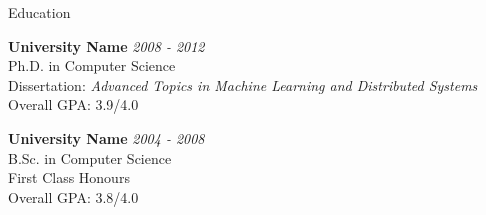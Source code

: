 \documentclass{resume} %
\begin{document}

\begin{rSection}{Education}

{\bf University Name} \hfill {\em 2008 - 2012} \\ 
Ph.D. in Computer Science \\
Dissertation: \textit{Advanced Topics in Machine Learning and Distributed Systems} \\
Overall GPA: 3.9/4.0

{\bf University Name} \hfill {\em 2004 - 2008} \\ 
B.Sc. in Computer Science \smallskip \\
First Class Honours \\
Overall GPA: 3.8/4.0

\end{rSection}

\end{document}
